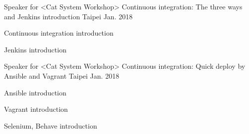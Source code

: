 

\begin{cventries}

  \cventry
    {Speaker for <Cat System Workshop>} %
    {Continuous integration: The three ways and Jenkins introduction} %
    {Taipei} %
    {Jan. 2018} %
    {
      \begin{cvitems} %
        \item {Continuous integration introduction}
        \item {Jenkins introduction}
      \end{cvitems}
    }

  \cventry
    {Speaker for <Cat System Workshop>} %
    {Continuous integration: Quick deploy by Ansible and Vagrant} %
    {Taipei} %
    {Jan. 2018} %
    {
      \begin{cvitems} %
        \item {Ansible introduction}
        \item {Vagrant introduction}
        \item {Selenium, Behave introduction}
      \end{cvitems}
    }

\end{cventries}
